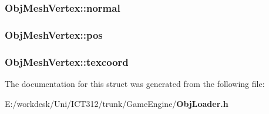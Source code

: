 \subsubsection[{normal}]{ Obj\+Mesh\+Vertex\+::normal}\label{struct_obj_mesh_vertex_ab71c952ad999426ccfb817a8ea69d9ce}
\subsubsection[{pos}]{ Obj\+Mesh\+Vertex\+::pos}\label{struct_obj_mesh_vertex_af6c11fe1420d93a4f86d61f3f9e72c65}
\subsubsection[{texcoord}]{ Obj\+Mesh\+Vertex\+::texcoord}\label{struct_obj_mesh_vertex_adfe4f29da6779a9d6bfc744fd12791a9}


The documentation for this struct was generated from the following file\+:\begin{DoxyCompactItemize}
\item 
E\+:/workdesk/\+Uni/\+I\+C\+T312/trunk/\+Game\+Engine/{\bf Obj\+Loader.\+h}\end{DoxyCompactItemize}
